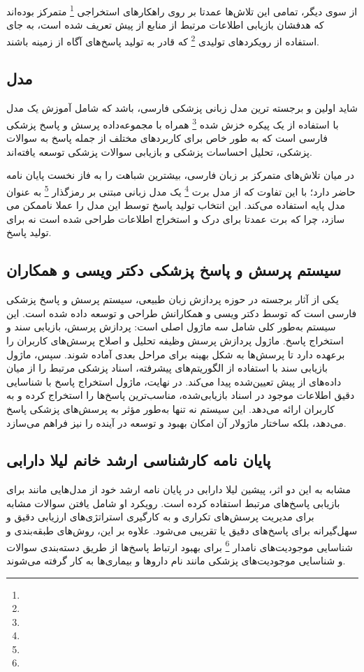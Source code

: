 از سوی دیگر، تمامی این تلاش‌ها عمدتا بر روی راهکارهای استخراجی 
\footnote{}
متمرکز بوده‌اند که هدفشان بازیابی اطلاعات مرتبط از منابع از پیش تعریف شده است، به جای استفاده از رویکردهای تولیدی
\footnote{}
که قادر به تولید پاسخ‌های آگاه از زمینه باشند.
\subsection{مدل 
}
شاید اولین و برجسته ترین مدل زبانی پزشکی فارسی، 
\cite{b45}
باشد که شامل آموزش یک مدل
\cite{b46}
با استفاده از یک پیکره خزش شده
\footnote{}
همراه با مجموعه‌داده پرسش و پاسخ پزشکی فارسی است که به طور خاص برای کاربردهای مختلف از جمله پاسخ به سوالات پزشکی، تحلیل احساسات پزشکی و بازیابی سوالات پزشکی توسعه یافته‌اند.

در میان تلاش‌های متمرکز بر زبان فارسی، بیشترین شباهت را به فاز نخست پایان نامه حاضر دارد؛ با این تفاوت که از مدل برت
\footnote{}
یک مدل زبانی مبتنی بر رمزگذار
\footnote{}
به عنوان مدل پایه استفاده می‌کند. این انتخاب تولید پاسخ توسط این مدل را عملا ناممکن می سازد، چرا که برت عمدتا برای درک و استخراج اطلاعات طراحی شده است نه برای تولید پاسخ.


\subsection{
	سیستم پرسش و پاسخ پزشکی دکتر ویسی و همکاران
}
یکی از آثار برجسته در حوزه پردازش زبان طبیعی، سیستم پرسش و پاسخ پزشکی فارسی است که توسط دکتر ویسی و همکارانش 
\cite{b47}
طراحی و توسعه داده شده است. این سیستم به‌طور کلی شامل سه ماژول اصلی است: پردازش پرسش، بازیابی سند و استخراج پاسخ. ماژول پردازش پرسش وظیفه تحلیل و اصلاح پرسش‌های کاربران را برعهده دارد تا پرسش‌ها به شکل بهینه برای مراحل بعدی آماده شوند. سپس، ماژول بازیابی سند با استفاده از الگوریتم‌های پیشرفته، اسناد پزشکی مرتبط را از میان داده‌های از پیش تعیین‌شده پیدا می‌کند. در نهایت، ماژول استخراج پاسخ با شناسایی دقیق اطلاعات موجود در اسناد بازیابی‌شده، مناسب‌ترین پاسخ‌ها را استخراج کرده و به کاربران ارائه می‌دهد. این سیستم نه تنها به‌طور مؤثر به پرسش‌های پزشکی پاسخ می‌دهد، بلکه ساختار ماژولار آن امکان بهبود و توسعه در آینده را نیز فراهم می‌سازد.
\subsection{
	پایان نامه کارشناسی ارشد خانم لیلا دارابی
}
مشابه به این دو اثر، پیشین لیلا دارابی در پایان نامه ارشد خود
\cite{b48}
از مدل‌هایی مانند 
\cite{b49}
برای بازیابی پاسخ‌های مرتبط استفاده کرده است. رویکرد او شامل یافتن سوالات مشابه برای مدیریت پرسش‌های تکراری و به کارگیری استراتژی‌های ارزیابی دقیق و سهل‌گیرانه برای پاسخ‌های دقیق یا تقریبی می‌شود. علاوه بر این، روش‌های طبقه‌بندی و شناسایی موجودیت‌های نامدار
\footnote{}
برای بهبود ارتباط پاسخ‌ها از طریق دسته‌بندی سوالات و شناسایی موجودیت‌های پزشکی مانند نام داروها و بیماری‌ها به کار گرفته می‌شوند.

